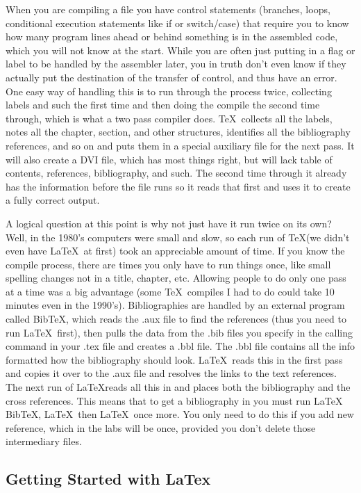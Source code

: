 When you are compiling a file you have control statements (branches, loops, conditional execution statements like if or switch/case) that require you to know how many program lines ahead or behind something is in the assembled code, which you will not know at the start.   While you are often just putting in a flag or label to be handled by the assembler later, you in truth don't even know if they actually put the destination of the transfer of control, and thus have an error.  One easy way of handling this is to run through the process twice, collecting labels and such the first time and then doing the compile the second time through, which is what a two pass compiler does.  \TeX\ collects all the labels, notes all the chapter, section, and other structures, identifies all the bibliography references, and so on and puts them in a special auxiliary file for the next pass.  It will also create a DVI file, which has most things right, but will lack table of contents, references, bibliography, and such.  The second time through it already has the information before the file runs so it reads that first and uses it to create a fully correct output.

A logical question at this point is why not just have it run twice on its own?  Well, in the 1980's computers were small and slow, so each run of \TeX (we didn't even have \LaTeX\ at first) took an appreciable amount of time.  If you know the compile process, there are times you only have to run things once, like small spelling changes not in a title, chapter, etc.  Allowing people to do only one pass at a time was a big advantage (some \TeX\ compiles I had to do could take 10 minutes even in the 1990's).  Bibliographies are handled by an external program called BibTeX, which reads the .aux file to find the references (thus you need to run \LaTeX\ first), then pulls the data from the .bib files you specify in the calling command in your .tex file and creates a .bbl file.  The .bbl file contains all the info formatted how the bibliography should look.  \LaTeX\ reads this in the first pass and copies it over to the .aux file and resolves the links to the text references.  The next run of \LaTeX reads all this in and places both the bibliography and the cross references.  This means that to get a bibliography in you must run \LaTeX\, BibTeX, \LaTeX\, then \LaTeX\ once more.  You only need to do this if you add new reference, which in the labs will be once, provided you don't delete those intermediary files.

\subsection{Getting Started with LaTex}

